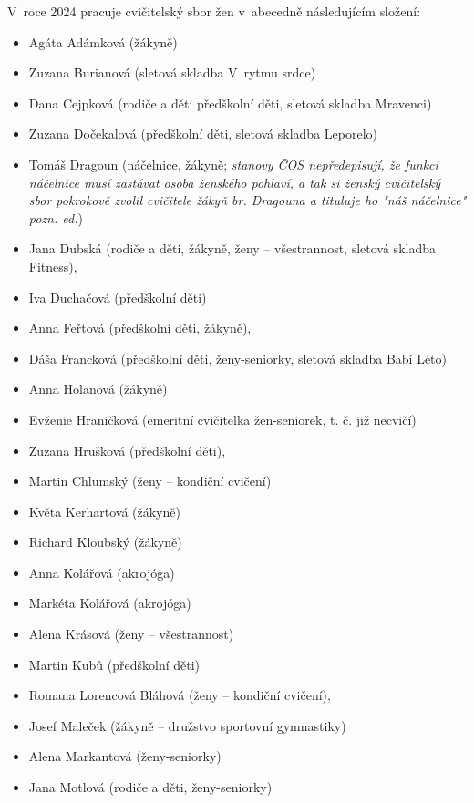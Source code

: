 \documentclass[a5paper, 11pt, twoside]{article}
\begin{document}
\noindent
V~roce 2024 pracuje cvičitelský sbor žen v~abecedně následujícím
složení:

\bigskip

  \begin{itemize}[label={},itemindent=-2em,leftmargin=2em,nosep]
  \item Agáta Adámková (žákyně)
  \item Zuzana Burianová (sletová skladba V~rytmu srdce)
  \item Dana Cejpková (rodiče a děti předškolní děti, sletová skladba Mravenci)
  \item Zuzana Dočekalová (předškolní děti, sletová skladba Leporelo)
  \item Tomáš Dragoun (náčelnice, žákyně; \textit{stanovy ČOS nepředepisují, že funkci náčelnice musí zastávat osoba ženského pohlaví, a tak  si ženský cvičitelský sbor pokrokově zvolil cvičitele žákyň br. Dragouna a tituluje ho "náš náčelnice" pozn. ed.})
  \item Jana Dubská (rodiče a děti, žákyně, ženy -- všestrannost, sletová skladba Fitness),
  \item Iva Duchačová (předškolní děti)
  \item Anna Feřtová (předškolní děti, žákyně),
  \item Dáša Francková (předškolní děti, ženy-seniorky, sletová skladba Babí Léto)
  \item Anna Holanová (žákyně)
  \item Evženie Hraničková (emeritní cvičitelka žen-seniorek, t. č. již necvičí)
  \item Zuzana Hrušková (předškolní děti),
  \item Martin Chlumský (ženy -- kondiční cvičení)
  \item Květa Kerhartová (žákyně)
  \item Richard Kloubský (žákyně)
  \item Anna Kolářová (akrojóga)
  \item Markéta Kolářová (akrojóga)
  \item Alena Krásová (ženy -- všestrannost)
  \item Martin Kubů (předškolní děti)
  \item Romana Lorencová Bláhová (ženy -- kondiční cvičení),
  \item Josef Maleček (žákyně -- družstvo sportovní gymnastiky)
  \item Alena Markantová (ženy-seniorky)
  \item Jana Motlová (rodiče a děti, ženy-seniorky)

\end{itemize}
\end{document}
